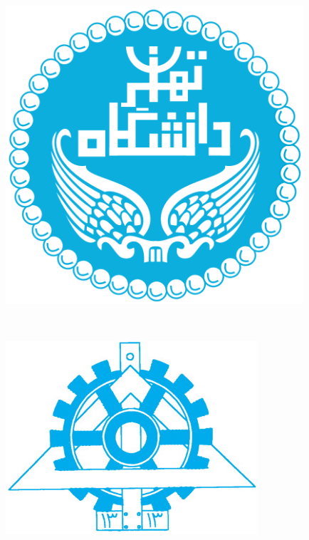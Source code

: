 \thispagestyle{first}
\begin{mdframed}
\begin{minipage}[t]{0.15\textwidth}
	\centering
	\includegraphics[width=0.83\textwidth]{ut} \\
    \studentName
\end{minipage}%
\begin{minipage}[b]{0.64\textwidth}
	\centering
	\courseName \\
	\homeworkName
\end{minipage}%
\begin{minipage}[t]{0.2\textwidth}
	\centering
	\includegraphics[width=0.7\textwidth]{fanni} \\
	\studentNumber
\end{minipage}%
\end{mdframed}
